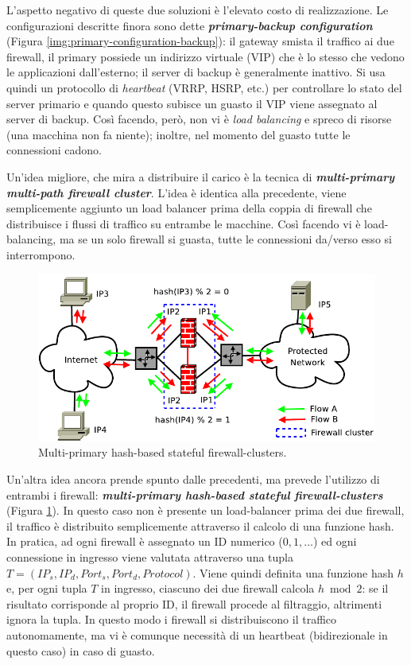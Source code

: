 L'aspetto negativo di queste due soluzioni è l'elevato costo di realizzazione. Le configurazioni descritte finora sono dette \textbf{\textit{primary-backup configuration}} (Figura \ref{img:primary-configuration-backup}): il gateway smista il traffico ai due firewall, il primary possiede un indirizzo virtuale (VIP) che è lo stesso che vedono le applicazioni dall'esterno; il server di backup è generalmente inattivo. Si usa quindi un protocollo di \textit{heartbeat} (VRRP, HSRP, etc.) per controllare lo stato del server primario e quando questo subisce un guasto il VIP viene assegnato al server di backup. Così facendo, però, non vi è \textit{load balancing} e spreco di risorse (una macchina non fa niente); inoltre, nel momento del guasto tutte le connessioni cadono.

Un'idea migliore, che mira a distribuire il carico è la tecnica di \textbf{\textit{multi-primary multi-path firewall cluster}}. L'idea è identica alla precedente, viene semplicemente aggiunto un load balancer prima della coppia di firewall che distribuisce i flussi di traffico su entrambe le macchine. Così facendo vi è load-balancing, ma se un solo firewall si guasta, tutte le connessioni da/verso esso si interrompono.
\begin{figure}[htbp]
	\centering
	\includegraphics[scale = 0.35]{images/multi-primary-hash-based-stateful-firewall-clusters}
	\caption{Multi-primary hash-based stateful firewall-clusters.}
	\label{img:multi-primary-hash-based-stateful-firewall-clusters}
\end{figure}

Un'altra idea ancora prende spunto dalle precedenti, ma prevede l'utilizzo di entrambi i firewall: \textbf{\textit{multi-primary hash-based stateful firewall-clusters}} (Figura \ref{img:multi-primary-hash-based-stateful-firewall-clusters}). In questo caso non è presente un load-balancer prima dei due firewall, il traffico è distribuito semplicemente attraverso il calcolo di una funzione hash. In pratica, ad ogni firewall è assegnato un ID numerico ($0,1,\dots$) ed ogni connessione in ingresso viene valutata attraverso una tupla $T = (IP_s, IP_d, Port_s, Port_d, Protocol)$. Viene quindi definita una funzione hash $h$ e, per ogni tupla $T$ in ingresso, ciascuno dei due firewall calcola $h\bmod 2$: se il risultato corrisponde al proprio ID, il firewall procede al filtraggio, altrimenti ignora la tupla. In questo modo i firewall si distribuiscono il traffico autonomamente, ma vi è comunque necessità di un heartbeat (bidirezionale in questo caso) in caso di guasto.

